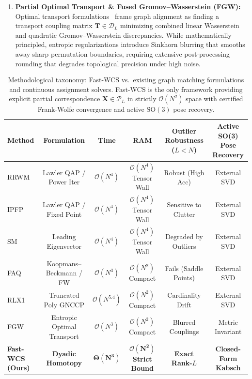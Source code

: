 \documentclass[a4paper,fleqn]{cas-dc}
\theoremstyle{thmstyleone}
\theoremstyle{thmstyletwo}
\theoremstyle{thmstylethree}
\begin{document}
\begin{enumerate}
    \item \textbf{Partial Optimal Transport \& Fused Gromov--Wasserstein (FGW):} Optimal transport formulations~\cite{peyre2019computational, titouan2019optimal} frame graph alignment as finding a transport coupling matrix $\mathbf{T} \in \mathcal{D}_L$ minimizing combined linear Wasserstein and quadratic Gromov--Wasserstein discrepancies. While mathematically principled, entropic regularizations introduce Sinkhorn blurring that smooths away sharp permutation boundaries, requiring extensive post-processing rounding that degrades topological precision under high noise.
\end{enumerate}

\begin{table}[!t]
\centering
\footnotesize
\caption{Methodological taxonomy: Fast-WCS vs.\ existing graph matching formulations and continuous assignment solvers. Fast-WCS is the only framework providing explicit partial correspondence $\mathbf{X} \in \mathcal{P}_L$ in strictly $\mathcal{O}(N^2)$ space with certified Frank-Wolfe convergence and active $\mathrm{SO}(3)$ pose recovery.}
\label{tab:methodology_comparison}
\setlength{\tabcolsep}{6pt}
\begin{tabular*}{\textwidth}{@{\extracolsep{\fill}}lccccc@{}}
\toprule
\textbf{Method} & \textbf{Formulation} & \textbf{Time} & \textbf{RAM} & \makecell{\textbf{Outlier Robustness}\\\textbf{($L < N$)}} & \makecell{\textbf{Active SO(3)}\\\textbf{Pose Recovery}} \\
\midrule
RRWM~\cite{cho2010rrwm} & Lawler QAP / Power Iter & $\mathcal{O}(N^4)$ & $\mathcal{O}(N^4)$ Tensor Wall & Robust (High Acc) & External SVD \\
IPFP~\cite{leordeanu2009ipfp} & Lawler QAP / Fixed Point & $\mathcal{O}(N^4)$ & $\mathcal{O}(N^4)$ Tensor Wall & Sensitive to Clutter & External SVD \\
SM~\cite{leordeanu2005} & Leading Eigenvector & $\mathcal{O}(N^4)$ & $\mathcal{O}(N^4)$ Tensor Wall & Degraded by Outliers & External SVD \\
FAQ~\cite{vogelstein2015fast} & Koopmans--Beckmann / FW & $\mathcal{O}(N^3)$ & $\mathcal{O}(N^2)$ Compact & Fails (Saddle Points) & External SVD \\
RLX1~\cite{yang2018algorithm} & Truncated Poly GNCCP & $\mathcal{O}(N^{5.4})$ & $\mathcal{O}(N^2)$ Compact & Cardinality Drift & External SVD \\
FGW~\cite{titouan2019optimal} & Entropic Optimal Transport & $\mathcal{O}(N^3)$ & $\mathcal{O}(N^2)$ Compact & Blurred Couplings & Metric Invariant \\
\textbf{Fast-WCS (Ours)} & \textbf{Dyadic Homotopy} & $\mathbf{\Theta(N^3)}$ & $\mathbf{\mathcal{O}(N^2)}$ \textbf{Strict Bound} & \textbf{Exact Rank-$L$} & \textbf{Closed-Form Kabsch} \\
\bottomrule
\end{tabular*}
\end{table}
\end{document}
